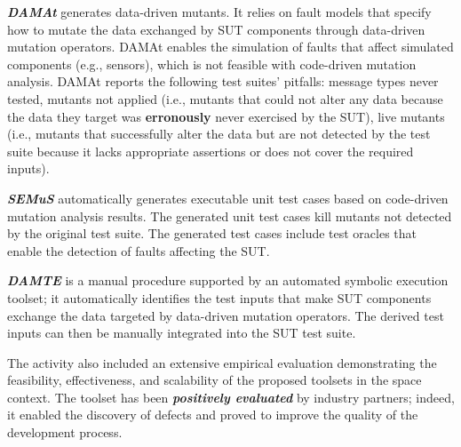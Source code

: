 \documentclass[a4paper]{report}
\begin{document}
\textbf{\emph{DAMAt}} generates data-driven mutants. 
It relies on fault models that specify how to mutate the data exchanged by SUT components through data-driven mutation operators. 
DAMAt enables the simulation of faults that affect simulated components (e.g., sensors), which is not feasible with code-driven mutation analysis. 
DAMAt reports the following test suites' pitfalls: message types never tested,
mutants not applied (i.e., mutants that could not alter any data because the data they target was \textbf{erronously} never exercised by the SUT),
live mutants (i.e., mutants that successfully alter the data but are not detected by the test suite because it lacks appropriate assertions or does not cover the required inputs).

\textbf{\emph{SEMuS}} automatically generates executable unit test cases based on code-driven mutation analysis results. The generated unit test cases kill mutants not detected by the original test suite. The generated test cases include test oracles that enable the detection of faults affecting the SUT.


\textbf{\emph{DAMTE}} is a manual procedure supported by an automated symbolic execution toolset; it automatically identifies the test inputs that make SUT components exchange the data targeted by data-driven mutation operators. The derived test inputs can then be manually integrated into the SUT test suite.
 
The activity also included an extensive empirical evaluation demonstrating the feasibility, effectiveness, and scalability of the proposed toolsets in the space context. The toolset has been \textbf{\emph{positively evaluated}} by industry partners; indeed, it enabled the discovery of defects and proved to improve the quality of the development process.
\end{document}
